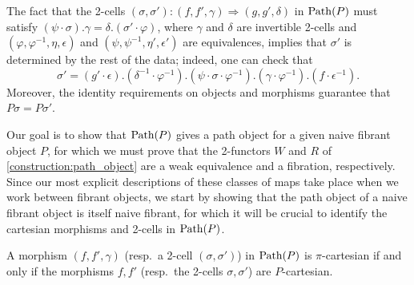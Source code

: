 \documentclass[11pt, dvipsnames]{amsart}
\begin{document}
    \begin{rmk}\label{Path2cells}
        The fact that the 2-cells $(\sigma,\sigma')\colon (f,f',\gamma)\Rightarrow (g,g',\delta)$ in $\mathrm{Path}(P)$ must satisfy $(\psi \cdot \sigma). \gamma = \delta.(\sigma' \cdot \varphi)$, where $\gamma$ and $\delta$ are invertible 2-cells and $(\varphi,\varphi^{-1},\eta,\epsilon)$ and $(\psi, \psi^{-1},\eta',\epsilon')$ are equivalences, implies that $\sigma'$ is determined by the rest of the data; indeed, one can check that
        \[\sigma'=(g'\cdot\epsilon).(\delta^{-1}\cdot \varphi^{-1}).(\psi\cdot\sigma\cdot \varphi^{-1}).(\gamma\cdot \varphi^{-1}).(f\cdot\epsilon^{-1}).\]
        Moreover, the identity requirements on objects and morphisms guarantee that $P\sigma=P\sigma'$.
    \end{rmk}

	Our goal is to show that $\mathrm{Path}(P)$ gives a path object for a given naive fibrant object $P$, for which we must prove that the 2-functors $W$ and $R$ of \cref{construction:path_object} are a weak equivalence and a fibration, respectively. Since our most explicit descriptions of these classes of maps take place when we work between fibrant objects, we start by showing that the path object of a naive fibrant object is itself naive fibrant, for which it will be crucial to identify the cartesian morphisms and 2-cells in $\mathrm{Path}(P)$.

\begin{lem}\label{lemma:markings}
	A morphism $(f,f',\gamma)$ (resp.\ a 2-cell $(\sigma,\sigma')$) in $\mathrm{Path}(P)$ is $\pi$-cartesian if and only if the morphisms $f,f'$ (resp.\ the 2-cells $\sigma,\sigma'$) are $P$-cartesian.
\end{lem}
\end{document}

